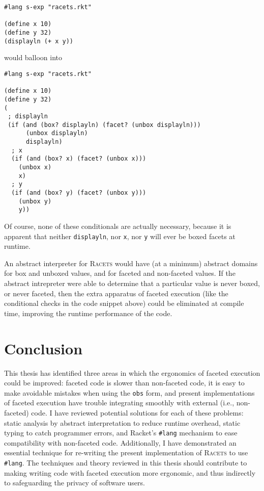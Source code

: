 \documentclass{article}
\begin{document}
\begin{lstlisting}
#lang s-exp "racets.rkt"

(define x 10)
(define y 32)
(displayln (+ x y))
\end{lstlisting}

\noindent would balloon into

\begin{lstlisting}
#lang s-exp "racets.rkt"

(define x 10)
(define y 32)
(
 ; displayln
 (if (and (box? displayln) (facet? (unbox displayln)))
      (unbox displayln)
      displayln)
  ; x
  (if (and (box? x) (facet? (unbox x)))
    (unbox x)
    x)
  ; y
  (if (and (box? y) (facet? (unbox y)))
    (unbox y)
    y))
\end{lstlisting}

Of course, none of these conditionals are actually necessary, because it is apparent that neither \texttt{displayln}, nor \texttt{x}, nor \texttt{y} will ever be boxed facets at runtime.

An abstract interpreter for \textsc{Racets} would have (at a minimum) abstract domains for box and unboxed values, and for faceted and non-faceted values. If the abstract intrepreter were able to determine that a particular value is never boxed, or never faceted, then the extra apparatus of faceted execution (like the conditional checks in the code snippet above) could be eliminated at compile time, improving the runtime performance of the code.



\section{Conclusion}
This thesis has identified three areas in which the ergonomics of faceted execution could be improved: faceted code is slower than non-faceted code, it is easy to make avoidable mistakes when using the \texttt{obs} form, and present implementations of faceted execution have trouble integrating smoothly with external (i.e., non-faceted) code. I have reviewed potential solutions for each of these problems: static analysis by abstract interpretation to reduce runtime overhead, static typing to catch programmer errors, and Racket's \texttt{\#lang} mechanism to ease compatibility with non-faceted code. Additionally, I have demonstrated an essential technique for re-writing the present implementation of \textsc{Racets} to use \texttt{\#lang}. The techniques and theory reviewed in this thesis should contribute to making writing code with faceted execution more ergonomic, and thus indirectly to safeguarding the privacy of software users.


\end{document}
